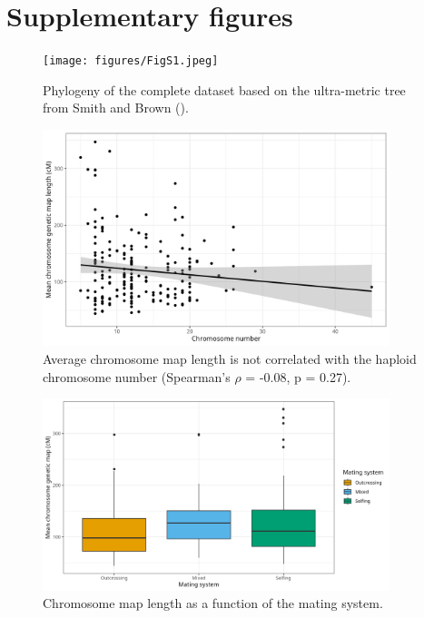 \documentclass{article}
\begin{document}
\printbibliography




\section*{Supplementary figures}

\renewcommand{\thefigure}{S\arabic{figure}}

\setcounter{figure}{0}


\begin{figure}[h!]
  \texttt{[image: figures/FigS1.jpeg]}
  \centering
  \caption{Phylogeny of the complete dataset based on the ultra-metric tree from Smith and Brown (\citeyear{smithConstructingBroadlyInclusive2018}).
  }
  \label{figure:FigS1}
\end{figure}



\begin{figure}[h!]
  \includegraphics[width=0.9\textwidth]{figures/FigS2.jpeg}
  \centering
  \caption{Average chromosome map length is not correlated with the haploid chromosome number (Spearman’s $\rho$ = -0.08, p = 0.27).
  }
  \label{figure:FigS2}
\end{figure}


\begin{figure}[h!]
  \includegraphics[width=0.9\textwidth]{figures/FigS3.jpeg}
  \centering
  \caption{Chromosome map length as a function of the mating system.
  }
  \label{figure:FigS3}
\end{figure}
\end{document}
